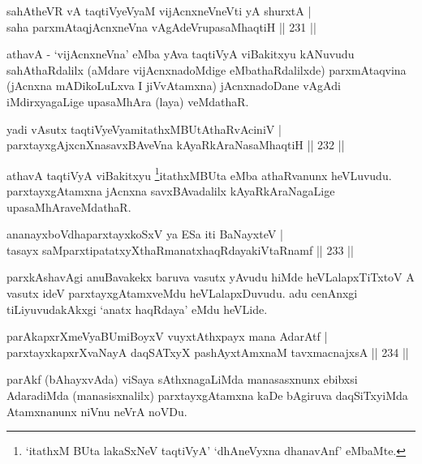 \begin{shl}
sahAtheVR vA taqtiVyeVyaM vijAcnxneVneVti yA shurxtA |\\
saha parxmAtaqjAcnxneVna vAgAdeVrupasaMhaqtiH \hfill || 231 ||
\end{shl}

\begin{artha}
athavA - `vijAcnxneVna' eMba yAva taqtiVyA viBakitxyu kANuvudu  sahAthaRdalilx (aMdare vijAcnxnadoMdige eMbathaRdalilxde) parxmAtaqvina (jAcnxna mADikoLuLxva I jiVvAtamxna) jAcnxnadoDane vAgAdi iMdirxyagaLige upasaMhAra (laya) veMdathaR.
\end{artha}

\begin{shl}
yadi vA\s sutx taqtiVyeVyamitathxMBUtAthaRvAciniV |\\
parxtayxgAjxcnXnasavxBAveVna kAyaRkAraNasaMhaqtiH \hfill || 232 ||
\end{shl}

\begin{artha}
athavA taqtiVyA viBakitxyu \footnote{`itathxM BUta lakaSxNeV taqtiVyA' `dhAneVyxna dhanavAnf' eMbaMte.}itathxMBUta eMba athaRvanunx heVLuvudu. parxtayxgAtamxna jAcnxna savxBAvadalilx kAyaRkAraNagaLige upasaMhAraveMdathaR.
\end{artha}

\begin{shl}
ananayxboVdhaparxtayxkoSxV ya ESa iti BaNayxteV |\\
tasayx saMparxtipatatxyXthaRmanatxhaqRdayakiVtaRnamf \hfill || 233 ||
\end{shl}

\begin{artha}
parxkAshavAgi anuBavakekx baruva vasutx yAvudu hiMde heVLalapxTiTxtoV A vasutx ideV parxtayxgAtamxveMdu heVLalapxDuvudu. adu cenAnxgi tiLiyuvudakAkxgi `anatx haqRdaya' eMdu heVLide.
\end{artha}


\begin{shl}
parAkapxrXmeVyaBUmiBoyxV vuyxtAthxpayx mana AdarAtf |\\
parxtayxkapxrXvaNayA daqSATxyX pashAyx\s \s tAmxnaM tavxmacnajxsA \hfill || 234 ||
\end{shl}

\begin{artha}
parAkf (bAhayxvAda) viSaya sAthxnagaLiMda manasasxnunx ebibxsi AdaradiMda (manasisxnalilx) parxtayxgAtamxna kaDe bAgiruva daqSiTxyiMda Atamxnanunx niVnu neVrA noVDu.
\end{artha}

